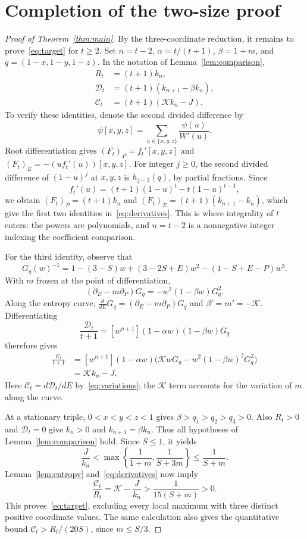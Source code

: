 \documentclass[11pt]{article}
\numberwithin{equation}{section}
\newcommand{\K}{\mathcal K}
\begin{document}
\section{Completion of the two-size proof}
\begin{proof}[Proof of Theorem~\ref{thm:main}]
By the three-coordinate reduction, it remains to prove~\eqref{eq:target}
for $t\ge2$. Set $n=t-2$, $\alpha=t/(t+1)$, $\beta=1+m$, and
$q=(1-x,1-y,1-z)$. In the notation of Lemma~\ref{lem:comparison},
\begin{equation}\label{eq:derivatives}
\begin{aligned}
 R_t&=(t+1)k_n,\\
 \mathcal D_t&=(t+1)(k_{n+1}-\beta k_n),\\
 \mathcal C_t&=(t+1)(\K k_n-J).
\end{aligned}
\end{equation}
To verify these identities, denote the second divided difference by
\[
 \psi[x,y,z]=\sum_{u\in\{x,y,z\}}\frac{\psi(u)}{W'(u)}.
\]
Root differentiation gives
$(F_t)_P=f_t'[x,y,z]$ and $(F_t)_E=-(uf_t'(u))[x,y,z]$.
For integer $j\ge0$, the second divided difference of $(1-u)^j$ at
$x,y,z$ is $h_{j-2}(q)$, by partial fractions. Since
\[
 f_t'(u)=(t+1)(1-u)^t-t(1-u)^{t-1},
\]
we obtain $(F_t)_P=(t+1)k_n$ and $(F_t)_E=(t+1)(k_{n+1}-k_n)$,
which give the first two identities in~\eqref{eq:derivatives}.
This is where integrality of $t$ enters: the powers are polynomials,
and $n=t-2$ is a nonnegative integer indexing the coefficient comparison.

For the third identity, observe that
\[
 G_q(w)^{-1}=1-(3-S)w+(3-2S+E)w^2-(1-S+E-P)w^3.
\]
With $m$ frozen at the point of differentiation,
\[
 (\partial_E-m\partial_P)G_q=-w^2(1-\beta w)G_q^2.
\]
Along the entropy curve, $\frac{d}{dE}G_q=(\partial_E-m\partial_P)G_q$
and $\beta'=m'=-\K$. Differentiating
\[
 \frac{\mathcal D_t}{t+1}
 =[w^{n+1}](1-\alpha w)(1-\beta w)G_q
\]
therefore gives
\[
\begin{aligned}
 \frac{\mathcal C_t}{t+1}
 &=[w^{n+1}](1-\alpha w)
       \bigl(\K wG_q-w^2(1-\beta w)^2G_q^2\bigr)\\
 &=\K k_n-J.
\end{aligned}
\]
Here $\mathcal C_t=d\mathcal D_t/dE$ by~\eqref{eq:variations}; the
$\K$ term accounts for the variation of $m$ along the curve.

At a stationary triple, $0<x<y<z<1$ gives
$\beta>q_1>q_2>q_3>0$. Also $R_t>0$ and $\mathcal D_t=0$ give
$k_n>0$ and $k_{n+1}=\beta k_n$. Thus all hypotheses of
Lemma~\ref{lem:comparison} hold. Since $S\le1$, it yields
\[
 \frac J{k_n}<\max\left\{\frac1{1+m},\frac1{S+3m}\right\}
 \le\frac1{S+m}.
\]
Lemma~\ref{lem:entropy} and~\eqref{eq:derivatives} now imply
\begin{equation}\label{eq:positive-curvature}
 \frac{\mathcal C_t}{R_t}=\K-\frac J{k_n}
 >\frac1{15(S+m)}>0.
\end{equation}
This proves~\eqref{eq:target}, excluding every local maximum with three
distinct positive coordinate values. The same calculation also gives the
quantitative bound $\mathcal C_t>R_t/(20S)$, since $m\le S/3$.


\end{proof}
\end{document}
